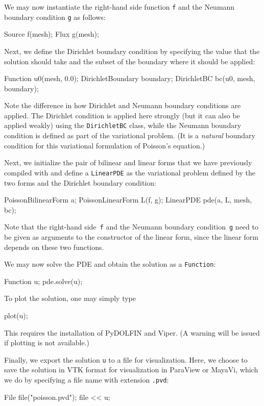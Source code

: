 We may now instantiate the right-hand side function \texttt{f} and the
Neumann boundary condition \texttt{g} as follows:
\begin{code}
Source f(mesh);
Flux g(mesh);
\end{code}

Next, we define the Dirichlet boundary condition by specifying the
value that the solution should take and the subset of the boundary
where it should be applied:
\begin{code}
Function u0(mesh, 0.0);
DirichletBoundary boundary;
DirichletBC bc(u0, mesh, boundary);
\end{code}
Note the difference in how Dirichlet and Neumann boundary conditions
are applied. The Dirichlet condition is applied here strongly (but it
can also be applied weakly) using the \texttt{DirichletBC} class,
while the Neumann boundary condition is defined as part of the
variational problem. (It is a \emph{natural} boundary condition for
this variational formulation of Poisson's equation.)

Next, we initialize the pair of bilinear and linear forms that we have
previously compiled with \ffc{} and define a \texttt{LinearPDE} as the
variational problem defined by the two forms and the Dirichlet
boundary condition:
\begin{code}
PoissonBilinearForm a;
PoissonLinearForm L(f, g);
LinearPDE pde(a, L, mesh, bc);
\end{code}
Note that the right-hand side~\texttt{f} and the Neumann boundary
condition~\texttt{g} need to be given as arguments to the constructor
of the linear form, since the linear form depends on these two
functions.

We may now solve the PDE and obtain the solution as a \texttt{Function}:
\begin{code}
Function u;
pde.solve(u);
\end{code}

To plot the solution, one may simply type
\begin{code}
plot(u);
\end{code}
This requires the installation of PyDOLFIN and Viper. (A warning will
be issued if plotting is not available.)

Finally, we export the solution \texttt{u} to a file for
visualization. Here, we choose to save the solution in VTK format for
visualization in ParaView or MayaVi, which we do by specifying a file
name with extension \texttt{.pvd}:
\begin{code}
File file("poisson.pvd");
file << u;
\end{code}

